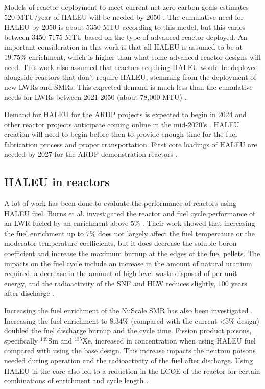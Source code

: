 Models of reactor deployment to meet current net-zero carbon goals 
estimates 520 MTU/year of \gls{HALEU} will be needed by 2050 
\cite{dixon_estimated_2022}. The cumulative need for \gls{HALEU} by 2050 
is about 5350 MTU according to this model, but this varies between 
3450-7175 MTU based on the type of advanced reactor deployed. An important 
consideration in this work is that all \gls{HALEU} is assumed to be 
at 19.75\% enrichment, which is higher than what some advanced reactor 
designs will need. This work also assumed that reactors 
requiring \gls{HALEU} would be deployed alongside reactors that don't 
require \gls{HALEU}, stemming from the deployment of new 
\glspl{LWR} and \glspl{SMR}. This expected demand is much less than the 
cumulative needs for \glspl{LWR} between 2021-2050 (about 78,000 MTU) \cite{dixon_estimated_2022}. 

Demand for \gls{HALEU} for the \gls{ARDP} projects is expected to begin in 
2024 and other reactor projects anticipate coming online in the 
mid-2020's \cite{nuclear_energy_institute_establishing_2022}. 
\gls{HALEU} creation will need to begin before then to provide enough 
time for the fuel fabrication process and proper transportation. First 
core loadings of \gls{HALEU} are needed by 2027 for the \gls{ARDP} 
demonstration reactors \cite{dixon_estimated_2022}. 

\subsection{HALEU in reactors}
A lot of work has been done to evaluate the performance of reactors 
using \gls{HALEU} fuel. Burns et al. investigated the reactor and fuel cycle 
performance of an \gls{LWR} fueled by an enrichment above 5\% \cite{burns_reactor_2020}.
Their work showed that increasing the fuel enrichment up to 7\% does not 
largely affect the fuel temperature or the moderator temperature coefficients,
but it does decrease the soluble boron coefficient and increase the maximum 
burnup at the edges of the fuel pellets. The impacts on the fuel cycle include 
an increase in the amount of natural uranium required, a decrease in the 
amount of high-level waste disposed of per unit energy, and the 
radioactivity of the \gls{SNF} and \gls{HLW} reduces slightly, 100 years 
after discharge \cite{burns_reactor_2020}.

Increasing the fuel enrichment of the NuScale \gls{SMR} has also been 
investigated \cite{carlson_implications_2022}. Increasing the fuel 
enrichment to 8.34\% (compared with the current <5\% design) doubled 
the fuel discharge burnup and the cycle time. 
Fission product poisons, specifically $^{149}$Sm and $^{135}$Xe, increased 
in concentration when using \gls{HALEU} fuel compared with using the base 
design. This increase impacts the 
neutron poisons needed during operation and the radioactivity of 
the fuel after discharge. Using \gls{HALEU} in the core also led to a 
reduction in the \gls{LCOE} of the reactor for certain combinations of 
enrichment and cycle length \cite{carlson_economic_2020,carlson_implications_2022}.

